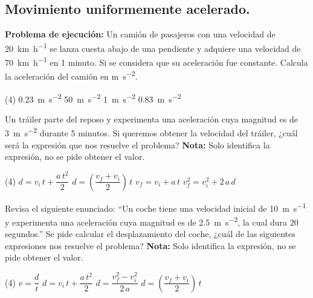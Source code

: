 \documentclass[12pt, letter]{exam}
\begin{document}


\newpage

\begin{questions}
    \section{Movimiento uniformemente acelerado.}

    \question \label{Problema_01} \textbf{Problema de ejecución:} Un camión de pasajeros con una velocidad de \SI{20}{\kilo\meter\per\hour} se lanza cuesta abajo de una pendiente y adquiere una velocidad de \SI{70}{\kilo\meter\per\hour} en \num{1} minuto. Si se considera que su aceleración fue constante. Calcula la aceleración del camión en \unit{\meter\per\square\second}.
    \begin{tasks}(4)
        \task \SI{0.23}{\meter\per\square\second}
        \task \SI{50}{\meter\per\square\second}
        \task \SI{1}{\meter\per\square\second}
        \task \SI{0.83}{\meter\per\square\second}
    \end{tasks}
    \question Un tráiler parte del reposo y experimenta una aceleración cuya magnitud es de \SI{3}{\meter\per\square\second} durante \num{5} minutos. Si queremos obtener la velocidad del tráiler, ¿cuál será la expresión que nos resuelve el problema? \textbf{Nota: } Solo identifica la expresión, no se pide obtener el valor.
    \begin{tasks}(4)
        \task $d = v_{i} \, t + \dfrac{a \, t^{2}}{2}$
        \task $d = \left( \dfrac{v_{f} + v_{i}}{2} \right) \, t$
        \task $v_{f} = v_{i} + a \, t$
        \task $v_{f}^{2} = v_{i}^{2} + 2\, a \, d$
    \end{tasks}
    \question Revisa el siguiente enunciado: \enquote{Un coche tiene una velocidad inicial de \SI{10}{\meter\per\second} y experimenta una aceleración cuya magnitud es de \SI{2.5}{\meter\per\square\second}, la cual dura \num{20} segundos.} Se pide calcular el desplazamiento del coche, ¿cuál de las siguientes expresiones nos resuelve el problema? \textbf{Nota: } Solo identifica la expresión, no se pide obtener el valor.
    \begin{tasks}(4)
        \task $v = \dfrac{d}{t}$
        \task $d = v_{i} \, t + \dfrac{a \, t^{2}}{2}$
        \task $d = \dfrac{v_{f}^{2} - v_{i}^{2}}{2 \, a}$
        \task $d = \left( \dfrac{v_{f} + v_{i}}{2} \right) \, t$
    \end{tasks}


\end{questions}
\end{document}
